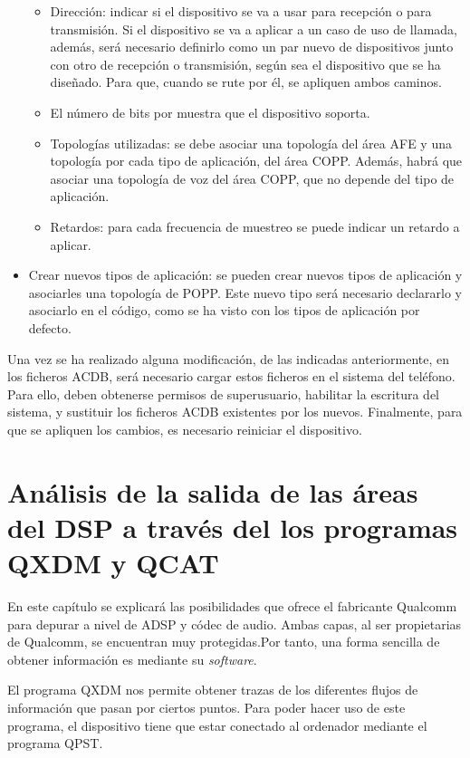 \begin{itemize}
\begin{itemize}
		\item{Dirección: indicar si el dispositivo se va a usar para recepción o para transmisión. Si el dispositivo se va a aplicar a un caso de uso de llamada, además, será necesario definirlo como un par nuevo de dispositivos junto con otro de recepción o transmisión, según sea el dispositivo que se ha diseñado. Para que, cuando se rute por él, se apliquen ambos caminos.}
		\item{El número de bits por muestra que el dispositivo soporta.}
		\item{Topologías utilizadas: se debe asociar una topología del área \gls{AFE} y una topología por cada tipo de aplicación, del área \gls{COPP}. Además, habrá que asociar una topología de voz del área \gls{COPP}, que no depende del tipo de aplicación.}
		\item{Retardos: para cada frecuencia de muestreo se puede indicar un retardo a aplicar.}
	\end{itemize}
	\item{Crear nuevos tipos de aplicación: se pueden crear nuevos tipos de aplicación y asociarles una topología de \gls{POPP}. Este nuevo tipo será necesario declararlo y asociarlo en el código, como se ha visto con los tipos de aplicación por defecto.}
\end{itemize}

Una vez se ha realizado alguna modificación, de las indicadas anteriormente, en los ficheros \gls{ACDB}, será necesario cargar estos ficheros en el sistema del teléfono. Para ello, deben obtenerse permisos de superusuario, habilitar la escritura del sistema, y sustituir los ficheros \gls{ACDB} existentes por los nuevos. Finalmente, para que se apliquen los cambios, es necesario reiniciar el dispositivo.

\section{Análisis de la salida de las áreas del DSP a través del los programas QXDM y QCAT} \label{sec:salida_qxdm}
En este capítulo se explicará las posibilidades que ofrece el fabricante Qualcomm para depurar a nivel de \gls{ADSP} y códec de audio. Ambas capas, al ser propietarias de Qualcomm, se encuentran muy protegidas.Por tanto, una forma sencilla de obtener información es mediante su \textit{software}.

El programa \gls{QXDM} nos permite obtener trazas de los diferentes flujos de información que pasan por ciertos puntos. Para poder hacer uso de este programa, el dispositivo tiene que estar conectado al ordenador mediante el programa \gls{QPST}.

